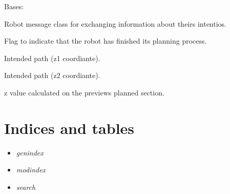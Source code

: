 \documentclass[letterpaper,10pt,english]{sphinxmanual}
\begin{document}
\begin{fulllineitems}
\label{Multi-robot motion planner:planning_sim.RobotMsg}
Bases: \href{http://docs.python.org/library/functions.html\#object}{}

Robot message class for exchanging information about theirs intentios.

\begin{fulllineitems}
\label{Multi-robot motion planner:planning_sim.RobotMsg.done_planning}
Flag to indicate that the robot has finished its planning process.

\end{fulllineitems}


\begin{fulllineitems}
\label{Multi-robot motion planner:planning_sim.RobotMsg.intended_path_z1}
Intended path (z1 coordiante).

\end{fulllineitems}


\begin{fulllineitems}
\label{Multi-robot motion planner:planning_sim.RobotMsg.intended_path_z2}
Intended path (z2 coordiante).

\end{fulllineitems}


\begin{fulllineitems}
\label{Multi-robot motion planner:planning_sim.RobotMsg.latest_z}
z value calculated on the previews planned section.

\end{fulllineitems}


\end{fulllineitems}



\chapter{Indices and tables}
\label{index:indices-and-tables}\begin{itemize}
\item {} 
\emph{genindex}

\item {} 
\emph{modindex}

\item {} 
\emph{search}

\end{itemize}
\end{document}
